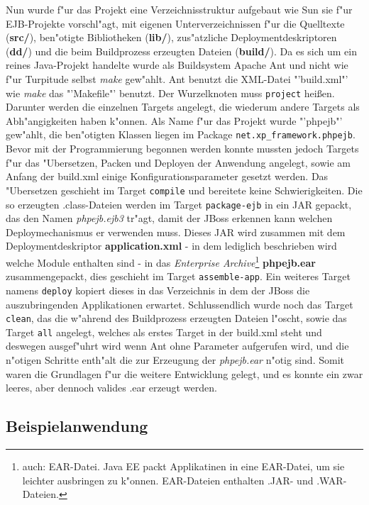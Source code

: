 Nun wurde f"ur das Projekt eine Verzeichnisstruktur aufgebaut wie Sun sie f"ur EJB-Projekte vorschl"agt, mit
eigenen Unterverzeichnissen f"ur die Quelltexte (\textbf{src/}), ben"otigte Bibliotheken (\textbf{lib/}), zus"atzliche 
Deploymentdeskriptoren (\textbf{dd/}) und die beim Buildprozess erzeugten Dateien (\textbf{build/}).
Da es sich um ein reines Java-Projekt handelte wurde als Buildsystem Apache Ant \cite{ANTHP} und nicht
wie f"ur Turpitude selbst \emph{make} gew"ahlt. Ant benutzt die XML-Datei "'build.xml"' wie \emph{make} das "'Makefile"'
benutzt. Der Wurzelknoten muss \texttt{project} hei\ss en. Darunter werden die einzelnen Targets angelegt, die
wiederum andere Targets als Abh"angigkeiten haben k"onnen. Als Name f"ur das Projekt wurde "'phpejb"' gew"ahlt,
die ben"otigten Klassen liegen im Package \texttt{net.xp\_framework.phpejb}. Bevor mit der Programmierung
begonnen werden konnte mussten jedoch Targets f"ur das "Ubersetzen, Packen und Deployen der Anwendung angelegt,
sowie am Anfang der build.xml einige Konfigurationsparameter gesetzt werden.
Das "Ubersetzen geschieht im Target \texttt{compile} und bereitete keine Schwierigkeiten. Die so erzeugten
.class-Dateien werden im Target \texttt{package-ejb} in ein JAR gepackt, das den Namen \emph{phpejb.ejb3} tr"agt,
damit der JBoss erkennen kann welchen Deploymechanismus er verwenden muss. Dieses JAR wird zusammen mit 
dem Deploymentdeskriptor \textbf{application.xml} - in dem lediglich beschrieben wird welche Module enthalten sind - in
das \emph{Enterprise Archive}\footnote{
auch: EAR-Datei. Java EE packt Applikatinen in eine EAR-Datei, um sie leichter ausbringen zu k"onnen. EAR-Dateien
enthalten .JAR- und .WAR-Dateien.
} \textbf{phpejb.ear} zusammengepackt, dies geschieht im Target \texttt{assemble-app}.
Ein weiteres Target namens \texttt{deploy} kopiert dieses in das Verzeichnis in dem der JBoss die auszubringenden
Applikationen erwartet. Schlussendlich wurde noch das Target \texttt{clean}, das die w"ahrend des
Buildprozess erzeugten Dateien l"oscht, sowie das Target \texttt{all} angelegt, welches als erstes Target in der
build.xml steht und deswegen ausgef"uhrt wird wenn Ant ohne Parameter aufgerufen wird, und die n"otigen Schritte
enth"alt die zur Erzeugung der \emph{phpejb.ear} n"otig sind. Somit waren die Grundlagen f"ur die weitere
Entwicklung gelegt, und es konnte ein zwar leeres, aber dennoch valides .ear erzeugt werden.

\subsection{Beispielanwendung}
\label{sec:chap2:infra:example}

